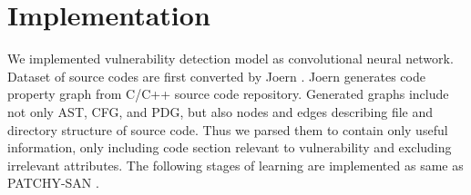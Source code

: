 \section{Implementation}

We implemented vulnerability detection model as convolutional neural network.
Dataset of source codes are first converted by Joern \cite{YamGolArpRie14}.
Joern generates code property graph from C/C++ source code repository.
Generated graphs include not only AST, CFG, and PDG, but also nodes and edges describing file and directory structure of source code.
Thus we parsed them to contain only useful information, only including code section relevant to vulnerability and excluding irrelevant attributes.
The following stages of learning are implemented as same as PATCHY-SAN \cite{niepert2016learning}.